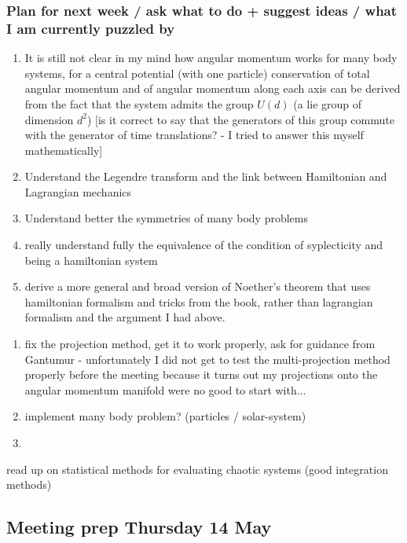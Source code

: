 \documentclass[12pt]{article}
\begin{document}
\subsubsection{Plan for next week / ask what to do + suggest ideas / what I am currently puzzled by}
\begin{enumerate}
    \item It is still not clear in my mind how angular momentum works for many body systems, for a central potential (with one particle) conservation of total angular momentum and of angular momentum along each axis can be derived from the fact that the system admits the group $U(d)$ (a lie group of dimension $d^2$) [is it correct to say that the generators of this group commute with the generator of time translations? - I tried to answer this myself mathematically]
    \item Understand the Legendre transform and the link between Hamiltonian and Lagrangian mechanics
    \item Understand better the symmetries of many body problems 
    \item really understand fully the equivalence of the condition of syplecticity and being a hamiltonian system
    \item derive a more general and broad version of Noether's theorem that uses hamiltonian formalism and tricks from the book, rather than lagrangian formalism and the argument I had above. 
\end{enumerate}
\begin{enumerate}
    \item fix the projection method, get it to work properly, ask for guidance from Gantumur - unfortunately I did not get to test the multi-projection method properly before the meeting because it turns out my projections onto the angular momentum manifold were no good to start with...
    \item implement many body problem? (particles / solar-system)
    \item 
\end{enumerate}

read up on statistical methods for evaluating chaotic systems (good integration methods)


\subsection{Meeting prep Thursday 14 May}
\end{document}
